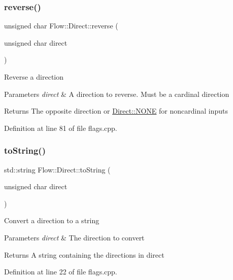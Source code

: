 \subsubsection{\texorpdfstring{reverse()}{reverse()}}
{\footnotesize\ttfamily unsigned char Flow\+::\+Direct\+::reverse (\begin{DoxyParamCaption}\item[{unsigned char}]{direct }\end{DoxyParamCaption})}

Reverse a direction 
\begin{DoxyParams}{Parameters}
{\em direct} & A direction to reverse. Must be a cardinal direction \\
\hline
\end{DoxyParams}
\begin{DoxyReturn}{Returns}
The opposite direction or \hyperlink{namespace_flow_1_1_direct_a3a2e55bf055fca941f5bd430389462ea}{Direct\+::\+N\+O\+NE} for noncardinal inputs 
\end{DoxyReturn}


Definition at line 81 of file flags.\+cpp.

\hypertarget{namespace_flow_1_1_direct_a7730679ec550d52f40e1ca296bf8ae67}{}\label{namespace_flow_1_1_direct_a7730679ec550d52f40e1ca296bf8ae67} 
\subsubsection{\texorpdfstring{to\+String()}{toString()}\hspace{0.1cm}{\footnotesize\ttfamily [1/2]}}
{\footnotesize\ttfamily std\+::string Flow\+::\+Direct\+::to\+String (\begin{DoxyParamCaption}\item[{unsigned char}]{direct }\end{DoxyParamCaption})}

Convert a direction to a string 
\begin{DoxyParams}{Parameters}
{\em direct} & The direction to convert \\
\hline
\end{DoxyParams}
\begin{DoxyReturn}{Returns}
A string containing the directions in direct 
\end{DoxyReturn}


Definition at line 22 of file flags.\+cpp.

